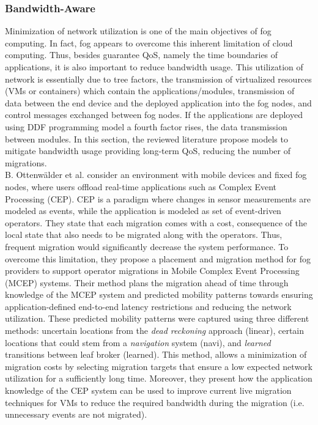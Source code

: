 \subsubsection{Bandwidth-Aware}\label{sec:bandwidth}
\noindent Minimization of network utilization is one of the main objectives of fog computing. In fact, fog appears to overcome this inherent limitation of cloud computing. Thus, besides guarantee QoS, namely the time boundaries of applications, it is also  important to reduce bandwidth usage. This utilization of network is essentially due to tree factors, the transmission of virtualized resources (VMs or containers) which contain the applications/modules, transmission of data between the end device and the deployed application into the fog nodes, and control messages exchanged between fog nodes. If the applications are deployed using DDF programming model a fourth factor rises, the data transmission between modules. In this section, the reviewed literature propose models to mitigate bandwidth usage providing long-term QoS, reducing the number of migrations.\\
\noindent\tab B. Ottenwälder et al. \cite{ottenwalder2013migcep} consider an environment with mobile devices and fixed fog nodes, where users offload real-time applications such as Complex Event Processing (CEP). CEP is a paradigm where changes in sensor measurements are modeled as events, while the application is modeled as set of event-driven operators. They state that each migration comes with a cost, consequence of the local state that also needs to be migrated along with the operators. Thus, frequent migration would significantly decrease the system performance. To overcome this limitation, they propose a placement and migration method for fog providers to support operator migrations in Mobile Complex Event Processing (MCEP) systems. Their method plans the migration ahead of time through knowledge of the MCEP system and predicted mobility patterns towards ensuring application-defined end-to-end latency restrictions and reducing the network utilization. These predicted mobility patterns were captured using three different methods: uncertain locations from the \textit{dead reckoning} approach (linear), certain locations that could stem from a \textit{navigation} system (navi), and \textit{learned} transitions between leaf broker (learned). This method, allows a minimization of migration costs by selecting migration targets that ensure a low expected network utilization for a sufficiently long time. Moreover, they present how the application knowledge of the CEP system can be used to improve current live migration techniques for VMs to reduce the required bandwidth during the migration (i.e. unnecessary events are not migrated).\\
